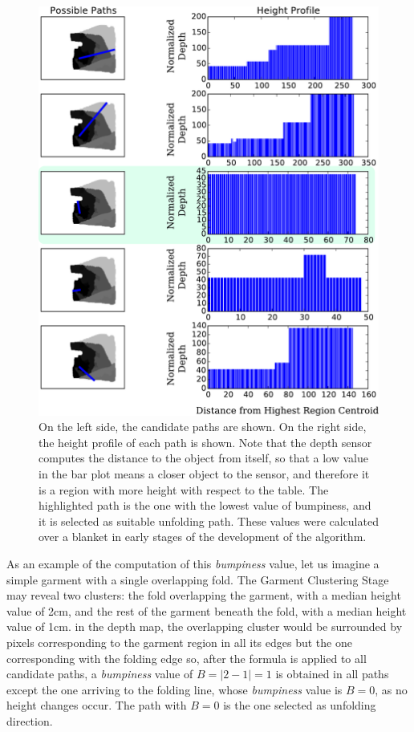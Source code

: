 \begin{figure}[thpb]
    \centering
    \includegraphics[width=\textwidth]{figures/candidate_paths.pdf}
    \caption[Bumpiness along several candidate paths.]
    {On the left side, the candidate paths are shown. On the right side, the height profile of each path is shown. Note that the depth sensor computes the distance to the object from itself, so that a low value in the bar plot means a closer object to the sensor, and therefore it is a region with more height with respect to the table. The highlighted path is the one with the lowest value of bumpiness, and it is selected as suitable unfolding path. These values were calculated over a blanket in early stages of the development of the algorithm.}
    \label{fig:paths_with_bumpiness}
\end{figure}

As an example of the computation of this \textit{bumpiness} value, let us imagine a simple garment with a single overlapping fold. The Garment Clustering Stage may reveal two clusters: the fold overlapping the garment, with a median height value of 2cm, and the rest of the garment beneath the fold, with a median height value of 1cm. in the depth map, the overlapping cluster would be surrounded by pixels corresponding to the garment region in all its edges but the one corresponding with the folding edge so, after the formula is applied to all candidate paths, a \textit{bumpiness} value of $B = |2 - 1| = 1$ is obtained in all paths except the one arriving to the folding line, whose \textit{bumpiness} value is $B=0$, as no height changes occur. The path with $B=0$ is the one selected as unfolding direction.

